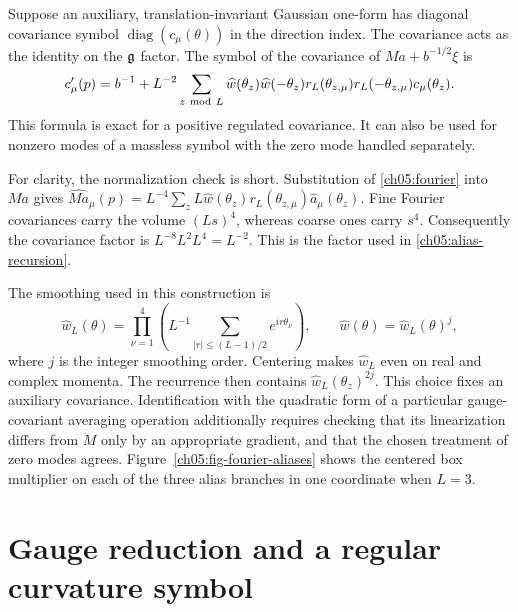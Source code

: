 Suppose an auxiliary, translation-invariant Gaussian one-form has
diagonal covariance symbol $\operatorname{diag}(c_\mu(\theta))$ in
the direction index. The covariance acts as the identity on the $\mathfrak g$ factor. The symbol of the covariance of
$Ma+b^{-1/2}\xi$ is
\begin{equation}
 c'_\mu(p)=b^{-1}
 +L^{-2}\sum_{z\ {\rm mod}\ L}
 \widehat w(\theta_z)\widehat w(-\theta_z)
 r_L(\theta_{z,\mu})r_L(-\theta_{z,\mu})c_\mu(\theta_z).
 \label{ch05:alias-recursion}
\end{equation}
This formula is exact for a positive regulated covariance. It can
also be used for nonzero modes of a massless symbol with the zero
mode handled separately.

For clarity, the normalization check is short. Substitution of
\eqref{ch05:fourier} into $Ma$ gives
$\widehat{Ma}_\mu(p)=L^{-4}\sum_z
L\widehat w(\theta_z)r_L(\theta_{z,\mu})
\widehat a_\mu(\theta_z)$.
Fine Fourier covariances carry the volume $(Ls)^4$, whereas coarse
ones carry $s^4$. Consequently the covariance factor is
$L^{-8}L^2L^4=L^{-2}$. This is the factor used in
\eqref{ch05:alias-recursion}.

The smoothing used in this construction is
\[
 \widehat w_L(\theta)=
 \prod_{\nu=1}^4\left(L^{-1}
       \sum_{|r|\le(L-1)/2}e^{ir\theta_\nu}\right),
 \qquad \widehat w(\theta)=\widehat w_L(\theta)^j,
\]
where $j$ is the integer smoothing order. Centering makes
$\widehat w_L$ even on real and complex momenta.
The recurrence then contains $\widehat w_L(\theta_z)^{2j}$.
This choice fixes an auxiliary covariance. Identification with the
quadratic form of a particular gauge-covariant averaging operation additionally
requires checking that its linearization differs from $M$ only by an
appropriate gradient, and that the chosen treatment of zero modes agrees.
Figure~\ref{ch05:fig-fourier-aliases} shows the centered box multiplier
on each of the three alias branches in one coordinate when $L=3$.



\FloatBarrier
\section{Gauge reduction and a regular curvature symbol}
\label{ch05:curvature}

